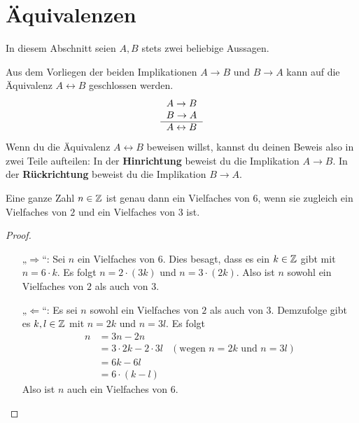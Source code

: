 \section{Äquivalenzen}


In diesem Abschnitt seien $A,B$ stets zwei beliebige Aussagen.


\begin{axiom} \label{hinruck}   
    Aus dem Vorliegen der beiden Implikationen $A\to B$ und $B\to A$ kann auf die Äquivalenz $A\leftrightarrow B$ geschlossen werden.
    \[\begin{tabular}{r}
        $A\to B$ \\
        $B\to A$ \\
        \hline
        $A\leftrightarrow B$
    \end{tabular}\]
    Wenn du die Äquivalenz $A\leftrightarrow B$ beweisen willst, kannst du deinen Beweis also in zwei Teile aufteilen: In der \textbf{Hinrichtung} beweist du die Implikation $A\to B$. In der \textbf{Rückrichtung} beweist du die Implikation $B\to A$.
\end{axiom}


\begin{bsp} \label{bsp:hinruck}
    Eine ganze Zahl $n\in \mathbb Z$ ist genau dann ein Vielfaches von $6$, wenn sie zugleich ein Vielfaches von $2$ und ein Vielfaches von $3$ ist.
\end{bsp}
\begin{proof}
    \begin{enumerate}
        \item[„$\Rightarrow$“:] Sei $n$ ein Vielfaches von $6$. Dies besagt, dass es ein $k\in \mathbb Z$ gibt mit $n=6\cdot k$. Es folgt $n=2\cdot (3k)$ und $n=3\cdot (2k)$. Also ist $n$ sowohl ein Vielfaches von $2$ als auch von $3$.
        \item[„$\Leftarrow$“:] Es sei $n$ sowohl ein Vielfaches von $2$ als auch von $3$. Demzufolge gibt es $k,l\in \mathbb Z$ mit $n=2k$ und $n=3l$. Es folgt
        \begin{align*}
            n & = 3n - 2n \\
            & = 3\cdot 2k - 2\cdot 3l & (\text{wegen $n=2k$ und $n=3l$})\\
            & = 6k - 6l \\
            & = 6\cdot (k-l)
        \end{align*}
        Also ist $n$ auch ein Vielfaches von $6$. \qedhere
    \end{enumerate}
\end{proof}


